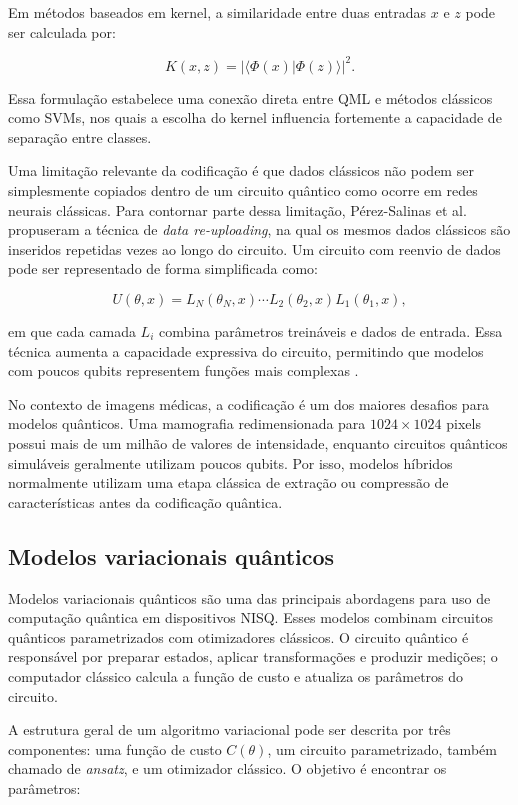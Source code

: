 \documentclass[
    12pt,
    openright,
    oneside,
    a4paper,
    english,
    brazil
]{abntex2}
\begin{document}
Em métodos baseados em kernel, a similaridade entre duas entradas \(x\) e \(z\) pode ser calculada por:

\[
K(x,z) =
|\langle \Phi(x) | \Phi(z) \rangle|^2.
\]

Essa formulação estabelece uma conexão direta entre QML e métodos clássicos como SVMs, nos quais a escolha do kernel influencia fortemente a capacidade de separação entre classes.

Uma limitação relevante da codificação é que dados clássicos não podem ser simplesmente copiados dentro de um circuito quântico como ocorre em redes neurais clássicas. Para contornar parte dessa limitação, Pérez-Salinas et al. propuseram a técnica de \textit{data re-uploading}, na qual os mesmos dados clássicos são inseridos repetidas vezes ao longo do circuito. Um circuito com reenvio de dados pode ser representado de forma simplificada como:

\[
U(\theta, x)
=
L_N(\theta_N, x)
\cdots
L_2(\theta_2, x)
L_1(\theta_1, x),
\]

em que cada camada \(L_i\) combina parâmetros treináveis e dados de entrada. Essa técnica aumenta a capacidade expressiva do circuito, permitindo que modelos com poucos qubits representem funções mais complexas \cite{perezsalinas2020data}.

No contexto de imagens médicas, a codificação é um dos maiores desafios para modelos quânticos. Uma mamografia redimensionada para \(1024 \times 1024\) pixels possui mais de um milhão de valores de intensidade, enquanto circuitos quânticos simuláveis geralmente utilizam poucos qubits. Por isso, modelos híbridos normalmente utilizam uma etapa clássica de extração ou compressão de características antes da codificação quântica.

\subsection{Modelos variacionais quânticos}

Modelos variacionais quânticos são uma das principais abordagens para uso de computação quântica em dispositivos NISQ. Esses modelos combinam circuitos quânticos parametrizados com otimizadores clássicos. O circuito quântico é responsável por preparar estados, aplicar transformações e produzir medições; o computador clássico calcula a função de custo e atualiza os parâmetros do circuito.

A estrutura geral de um algoritmo variacional pode ser descrita por três componentes: uma função de custo \(C(\theta)\), um circuito parametrizado, também chamado de \textit{ansatz}, e um otimizador clássico. O objetivo é encontrar os parâmetros:
\end{document}
